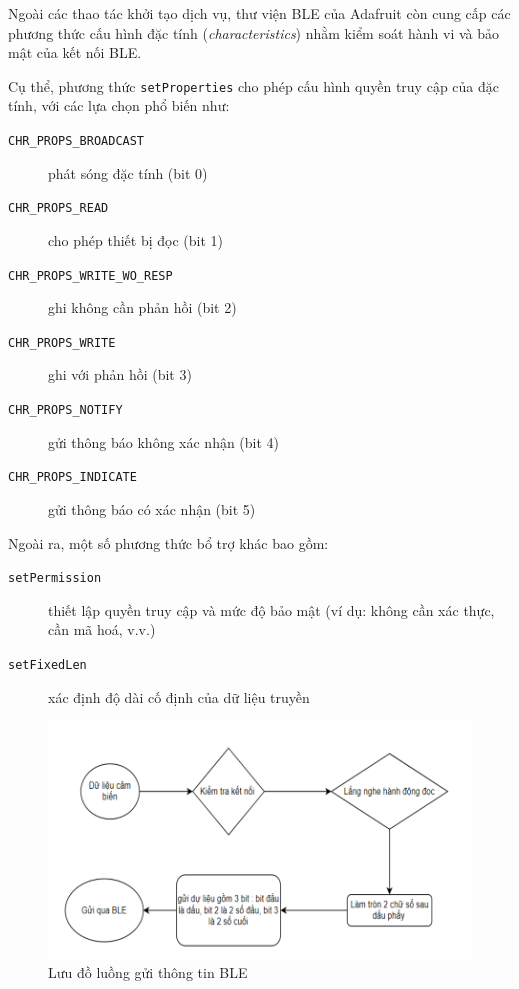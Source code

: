 

Ngoài các thao tác khởi tạo dịch vụ, thư viện BLE của Adafruit còn cung cấp các phương thức cấu hình đặc tính (\textit{characteristics}) nhằm kiểm soát hành vi và bảo mật của kết nối BLE.

Cụ thể, phương thức \texttt{setProperties} cho phép cấu hình quyền truy cập của đặc tính, với các lựa chọn phổ biến như:

\begin{description}
    \item[\texttt{CHR\_PROPS\_BROADCAST}] phát sóng đặc tính (bit 0)
    \item[\texttt{CHR\_PROPS\_READ}] cho phép thiết bị đọc (bit 1)
    \item[\texttt{CHR\_PROPS\_WRITE\_WO\_RESP}] ghi không cần phản hồi (bit 2)
    \item[\texttt{CHR\_PROPS\_WRITE}] ghi với phản hồi (bit 3)
    \item[\texttt{CHR\_PROPS\_NOTIFY}] gửi thông báo không xác nhận (bit 4)
    \item[\texttt{CHR\_PROPS\_INDICATE}] gửi thông báo có xác nhận (bit 5)
\end{description}

Ngoài ra, một số phương thức bổ trợ khác bao gồm:

\begin{description}
    \item[\texttt{setPermission}] thiết lập quyền truy cập và mức độ bảo mật (ví dụ: không cần xác thực, cần mã hoá, v.v.)
    \item[\texttt{setFixedLen}] xác định độ dài cố định của dữ liệu truyền
\end{description}

\begin{figure}[htbp]
    \centering
    \includegraphics[width=\textwidth]{images/sendBleFlow.png}
    \caption{Lưu đồ luồng gửi thông tin BLE}
    \label{sendBleFlow}
\end{figure}


